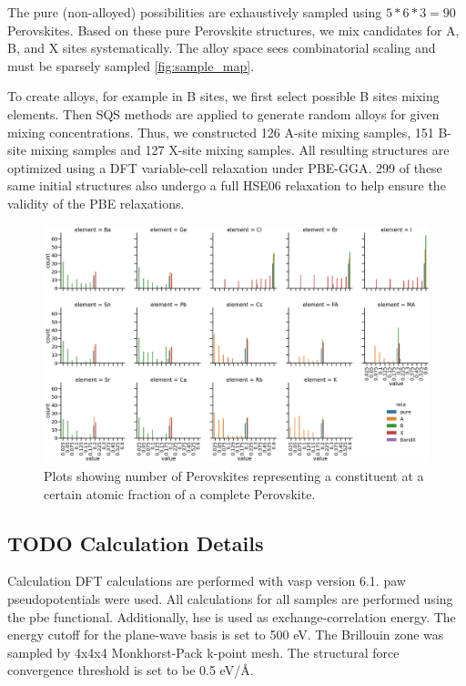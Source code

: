 \documentclass[twoside, twocolumn, 9pt, draft]{article}
\begin{document}
The pure (non-alloyed) possibilities are exhaustively sampled using
\(5*6*3 = 90\) Perovskites. Based on these pure Perovskite structures,
we mix candidates for A, B, and X sites systematically. The alloy
space sees combinatorial scaling and must be sparsely sampled
\ref{fig:sample_map}.

To create alloys, for example in B sites, we first select possible B
sites mixing elements.  Then SQS methods are applied to generate
random alloys for given mixing concentrations. Thus, we constructed
126 A-site mixing samples, 151 B-site mixing samples and 127 X-site
mixing samples. All resulting structures are optimized using a DFT
variable-cell relaxation under PBE-GGA. 299 of these same initial
structures also undergo a full HSE06 relaxation to help ensure the
validity of the PBE relaxations.

\begin{figure}
\centering
\includegraphics[width=.9\linewidth]{variability_of_composition_vectors.png}
\caption{\label{fig:chemspace_uni} Plots showing number of Perovskites representing a constituent at a certain atomic fraction of a complete Perovskite.}
\end{figure}

\subsection*{{\bfseries\sffamily TODO} Calculation Details}
\label{sec:org0c60371}
Calculation DFT calculations are performed with \gls{vasp} version
6.1. \acrfull{paw} pseudopotentials were used. All calculations for
all samples are performed using the \acrfull{pbe}
functional. Additionally, \acrfull{hse} is used as
exchange-correlation energy. The energy cutoff for the plane-wave
basis is set to 500 eV. The Brillouin zone was sampled by 4x4x4
Monkhorst-Pack k-point mesh. The structural force convergence
threshold is set to be 0.5 eV/Å.
\end{document}
